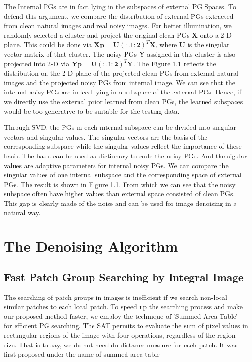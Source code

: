\documentclass[10pt,twocolumn,letterpaper]{article}
\begin{document}
The Internal PGs are in fact lying in the subspaces of external PG Spaces. To defend this argument, we compare the distribution of external PGs extracted from clean natural images and real noisy images. For better illumination, we randomly selected a cluster and project the original clean PGs $\mathbf{X}$ onto a 2-D plane. This could be done via $\mathbf{Xp}=\mathbf{U(:.1:2)}^{T}\mathbf{X}$, where $\mathbf{U}$ is the singular vector matrix of that cluster. The noisy PGs $\mathbf{Y}$ assigned in this cluster is also projected into 2-D via $\mathbf{Yp}=\mathbf{U(:.1:2)}^{T}\mathbf{Y}$. The Figure \ref{} reflects the distribution on the 2-D plane of the projected clean PGs from external natural images and the projected noisy PGs from internal image. We can see that the internal noisy PGs are indeed lying in a subspace of the external PGs. Hence, if we directly use the external prior learned from clean PGs, the learned subspaces would be too generative to be suitable for the testing data. 

Through SVD, the PGs in each internal subspace can be divided into singular vectors and singular values. The singular vectors are the basis of the corresponding subspace while the singular values reflect the importance of these basis. The basis can be used as dictionary to code the noisy PGs. And the sigular values are adaptive parameters for internal noisy PGs. We can compare the singular values of one internal subspace and the corresponding space of external PGs. The result is shown in Figure \ref{}. From which we can see that the noisy subspace often have higher values than external space consisted of clean PGs. This gap is clearly made of the noise and can be used for image denoising in a natural way.


\section{The Denoising Algorithm}
\subsection{Fast Patch Group Searching by Integral Image}
The searching of patch groups in images is inefficient if we search non-local similar patches to each local patch. To speed up the searching process and make our proposed method faster, we employ the technique of 'Summed Area Table' \cite{sat} for efficient PG searching. The SAT permits to evaluate the sum of pixel values in rectangular regions of the image with four operations, regardless of the region size. That is to say, we do not need do distance measure for each patch. It was first proposed under the name of summed area table\cite{viola2004robust}
\end{document}
